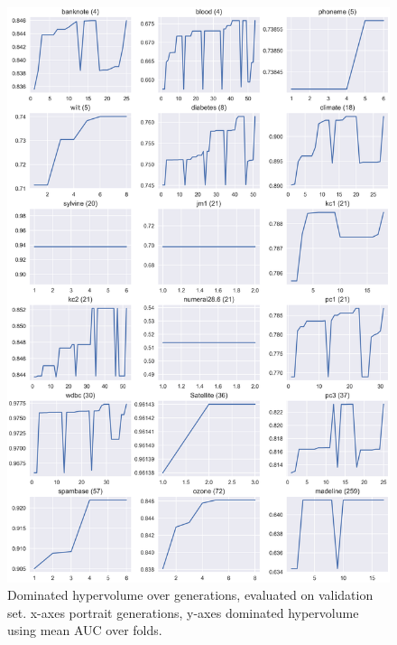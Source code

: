 \documentclass[twoside,11pt]{article}
\begin{document}
\begin{figure}
  \centering
  \includegraphics[width=0.9\linewidth]{../code/export/plot_val_dhvs_over_time.png}
  \caption{Dominated hypervolume over generations, evaluated on validation set.
            x-axes portrait generations, y-axes dominated hypervolume using mean AUC over folds.}
  \label{fig-val-dhvs}
\end{figure}
\end{document}
